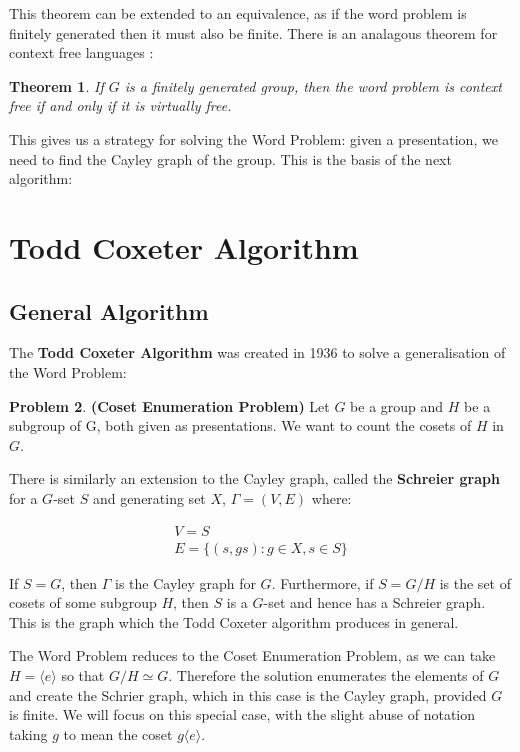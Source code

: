\documentclass[10pt]{article}
\theoremstyle{plain}
\newtheorem{theorem}{Theorem}[section]
\theoremstyle{definition}
\theoremstyle{definition}
\theoremstyle{definition}
\newtheorem{problem}[theorem]{Problem}
\begin{document}
\begin{multicols}{2}
This theorem can be extended to an equivalence, as if the word problem is finitely generated then it must also be finite. There is an analagous theorem for context free languages \cite{RegularWords}:

\begin{theorem}
	 If $G$ is a finitely generated group, then the word problem is context free if and only if it is virtually free.
\end{theorem}

This gives us a strategy for solving the Word Problem: given a presentation, we need to find the Cayley graph of the group. This is the basis of the next algorithm:


\section{Todd Coxeter Algorithm}

\subsection{General Algorithm}

The \textbf{Todd Coxeter Algorithm} was created in 1936 to solve a generalisation of the Word Problem:

\begin{problem}
	\textbf{(Coset Enumeration Problem)} Let $G$ be a group and $H$ be a subgroup of G, both given as presentations. We want to count the cosets of $H$ in $G$.
\end{problem}

There is similarly an extension to the Cayley graph, called the \textbf{Schreier graph} for a $G$-set $S$ and generating set $X$, $\Gamma = (V, E)$ where:

\begin{gather*}
	V = S \\
	E = \{ (s, gs) : g \in X, s \in S \}
\end{gather*}

If $S = G$, then $\Gamma$ is the Cayley graph for $G$. Furthermore, if $S = G/H$ is the set of cosets of some subgroup $H$, then $S$ is a $G$-set and hence has a Schreier graph. This is the graph which the Todd Coxeter algorithm produces in general.

The Word Problem reduces to the Coset Enumeration Problem, as we can take $H = \langle e \rangle$ so that $G/H \simeq G$. Therefore the solution enumerates the elements of $G$ and create the Schrier graph, which in this case is the Cayley graph, provided $G$ is finite. We will focus on this special case, with the slight abuse of notation taking $g$ to mean the coset $g \langle e \rangle$.


\end{multicols}
\end{document}
